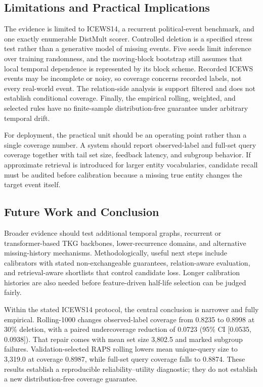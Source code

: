 \subsection{Limitations and Practical Implications}

The evidence is limited to ICEWS14, a recurrent political-event benchmark, and
one exactly enumerable DistMult scorer. Controlled deletion is a specified
stress test rather than a generative model of missing events. Five seeds limit
inference over training randomness, and the moving-block bootstrap still assumes
that local temporal dependence is represented by its block scheme. Recorded
ICEWS events may be incomplete or noisy, so coverage concerns recorded labels,
not every real-world event. The relation-side analysis is support filtered and
does not establish conditional coverage. Finally, the empirical rolling,
weighted, and selected rules have no finite-sample distribution-free guarantee
under arbitrary temporal drift.

For deployment, the practical unit should be an operating point rather than a
single coverage number. A system should report observed-label and full-set
query coverage together with tail set size, feedback latency, and subgroup
behavior. If approximate retrieval is introduced for larger entity
vocabularies, candidate recall must be audited before calibration because a
missing true entity changes the target event itself.

\subsection{Future Work and Conclusion}

Broader evidence should test additional temporal graphs, recurrent or
transformer-based TKG backbones, lower-recurrence domains, and alternative
missing-history mechanisms. Methodologically, useful next steps include
calibrators with stated non-exchangeable guarantees, relation-aware evaluation,
and retrieval-aware shortlists that control candidate loss. Longer calibration
histories are also needed before feature-driven half-life selection can be
judged fairly.

Within the stated ICEWS14 protocol, the central conclusion is narrower and
fully empirical. Rolling-1000 changes observed-label coverage from 0.8235 to
0.8998 at 30\% deletion, with a paired undercoverage reduction of 0.0723 (95\%
CI [0.0535, 0.0938]). That repair comes with mean set size 3,802.5 and marked
subgroup failures. Validation-selected RAPS rolling lowers mean unique-query
size to 3,319.0 at coverage 0.8987, while full-set query coverage falls to
0.8874. These results establish a reproducible reliability--utility diagnostic;
they do not establish a new distribution-free coverage guarantee.

